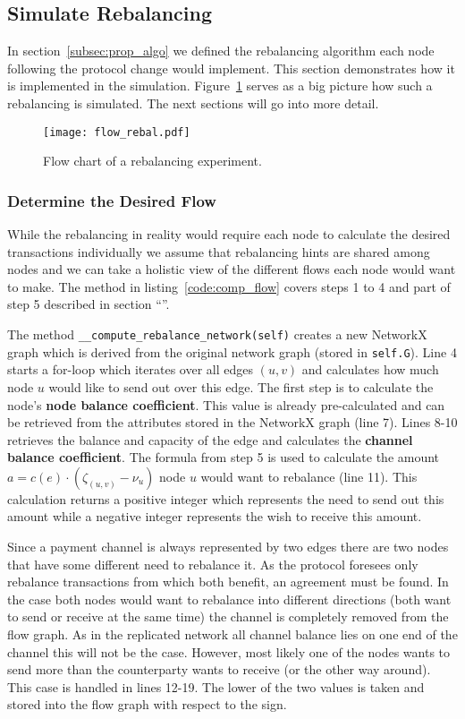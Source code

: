\documentclass[final]{fhnwreport}       %
\begin{document}
\subsection{Simulate Rebalancing}\label{subsec:sim_rebal}
In section~\ref{subsec:prop_algo} we defined the rebalancing algorithm each node following the protocol change would implement. This section demonstrates how it is implemented in the simulation. Figure~\ref{fig:flow_rebal} serves as a big picture how such a rebalancing is simulated. The next sections will go into more detail. 

\begin{figure}[H]
\centering
\texttt{[image: flow\_rebal.pdf]}
\caption{Flow chart of a rebalancing experiment.}
\label{fig:flow_rebal}
\end{figure}

\subsubsection{Determine the Desired Flow}\label{subsub:flow}
While the rebalancing in reality would require each node to calculate the desired transactions individually we assume that rebalancing hints are shared among nodes and we can take a holistic view of the different flows each node would want to make. The method in listing~\ref{code:comp_flow} covers steps 1 to 4 and part of step 5 described in section ``''.

The method \texttt{__compute_rebalance_network(self)} creates a new NetworkX graph which is derived from the original network graph (stored in \texttt{self.G}). Line 4 starts a for-loop which iterates over all edges $(u, v)$ and calculates how much node $u$ would like to send out over this edge. The first step is to calculate the node's \textbf{node balance coefficient}. This value is already pre-calculated and can be retrieved from the attributes stored in the NetworkX graph (line 7). Lines 8-10 retrieves the balance and capacity of the edge and calculates the \textbf{channel balance coefficient}. The formula from step 5 is used to calculate the amount $a = c(e)\cdot (\zeta_{(u,v)}-\nu_u)$ node $u$ would want to rebalance (line 11). This calculation returns a positive integer which represents the need to send out this amount while a negative integer represents the wish to receive this amount. 

Since a payment channel is always represented by two edges there are two nodes that have some different need to rebalance it. As the protocol foresees only rebalance transactions from which both benefit, an agreement must be found. In the case both nodes would want to rebalance into different directions (both want to send or receive at the same time) the channel is completely removed from the flow graph. As in the replicated network all channel balance lies on one end of the channel this will not be the case. However, most likely one of the nodes wants to send more than the counterparty wants to receive (or the other way around). This case is handled in lines 12-19. The lower of the two values is taken and stored into the flow graph with respect to the sign.
\end{document}
